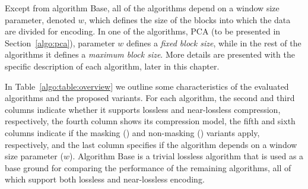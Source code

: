 Except from algorithm Base, all of the algorithms depend on a window size parameter, denoted $w$, which defines the size of the blocks into which the data are divided for encoding. In one of the algorithms, PCA (to be presented in Section~\ref{algo:pca}), parameter $w$ defines a \textit{fixed block size}, while in the rest of the algorithms it defines a \textit{maximum block size}.
More details are presented with the specific description of each algorithm, later in this chapter.


In Table~\ref{algo:table:overview} we outline some characteristics of the evaluated algorithms and the proposed variants. For each algorithm, the second and third columns indicate whether it supports lossless and near-lossless compression, respectively, the fourth column shows its compression model, the fifth and sixth columns indicate if the masking (\maskalgo) and non-masking (\NOmaskalgo) variants apply, respectively, and the last column specifies if the algorithm depends on a window size parameter ($w$). Algorithm Base is a trivial lossless algorithm that is used as a base ground for comparing the performance of the remaining algorithms, all of which support both lossless and near-lossless encoding.


\clearpage




